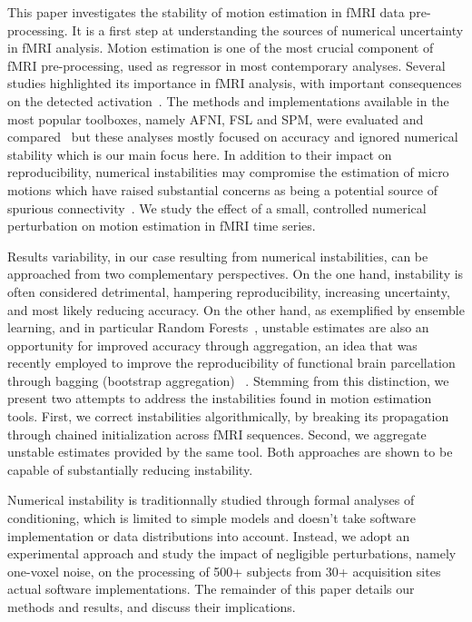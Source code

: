 \documentclass[11pt]{IEEEtran}
\begin{document}
 This paper investigates the stability of motion estimation in fMRI data
 pre-processing. It is a first step at understanding the sources of
 numerical uncertainty in fMRI analysis. Motion estimation is one of the
 most crucial component of fMRI pre-processing, used as regressor in most
 contemporary analyses. Several studies highlighted its importance in fMRI
 analysis, with important consequences on the detected
 activation~\cite{OAKES2005529}.
 The methods and implementations available in the most popular toolboxes,
 namely AFNI, FSL and SPM, were evaluated and compared~\cite{OAKES2005529, comparisons}
 but these analyses mostly focused on accuracy and ignored numerical
 stability which is our main focus here. In addition to their impact on
 reproducibility, numerical instabilities may compromise the estimation of
 micro motions which have raised substantial concerns as being a potential
 source of spurious connectivity~\cite{power2012spurious}. We study the
 effect of a small, controlled numerical perturbation on motion estimation
 in fMRI time series.

 Results variability, in our case resulting from numerical instabilities,
 can be approached from two complementary perspectives. On the one hand,
 instability is often considered detrimental, hampering reproducibility,
 increasing uncertainty, and most likely reducing accuracy. On the other
 hand, as exemplified by ensemble learning, and in particular Random
 Forests~\cite{breiman1996bagging, breiman2001random},  
 unstable estimates are also an opportunity for improved accuracy through
 aggregation, an idea that was recently employed to improve the
 reproducibility of functional brain parcellation through bagging
 (bootstrap aggregation)
 ~\cite{NIKOLAIDIS2020116678}.
 Stemming from this distinction, we present two attempts to address the
 instabilities found in motion estimation tools. First, we correct
 instabilities algorithmically, by breaking its propagation through chained
 initialization across fMRI sequences. Second, we aggregate unstable
 estimates provided by the same tool. Both approaches are shown to be
 capable of substantially reducing instability.

 Numerical instability is traditionnally studied through formal analyses of
 conditioning, which is limited to simple models and doesn't take software
 implementation or data distributions into account. Instead, we adopt an
 experimental approach and study the impact of negligible perturbations,
 namely one-voxel noise, on the processing of 500+ subjects from 30+
 acquisition sites actual software implementations. The remainder of this paper 
 details our methods and results, and discuss their implications.
 
\end{document}
